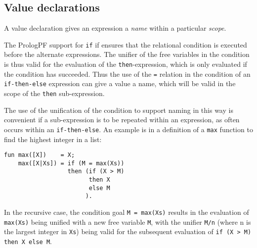 \subsection{Value declarations}
\label{val}

A value declaration gives an expression a \textit{name} within a
particular \textit{scope}.

The PrologPF support for \texttt{if} if ensures that the relational
condition is executed before the alternate expressions.  The
unifier of the free variables in the condition is thus valid for
the evaluation of the \texttt{then}-expression, which is only
evaluated if the condition has succeeded.  Thus the use of the
\texttt{=} relation in the condition of an
\texttt{if-then-else} expression can give a value a name, which will
be valid in the scope of the \texttt{then} sub-expression.

The use of the unification of the condition to support naming in this
way is convenient if a sub-expression is to be repeated within an
expression, as often occurs within an \texttt{if-then-else}.  An
example is in a definition of a \texttt{max} function to find
the highest integer in a list:
\begin{verbatim}
fun max([X])    = X;
    max([X|Xs]) = if (M = max(Xs))
                  then (if (X > M)
                        then X
                        else M
                       ).
\end{verbatim}
In the recursive case,  the condition goal \texttt{M = max(Xs)} results
in the evaluation of \texttt{max(Xs)} being unified with a new free
variable \texttt{M}, with the unifier \texttt{M/n} (where n is the
largest integer in \texttt{Xs}) being valid for the subsequent
evaluation of \texttt{if (X > M) then X else M}.

